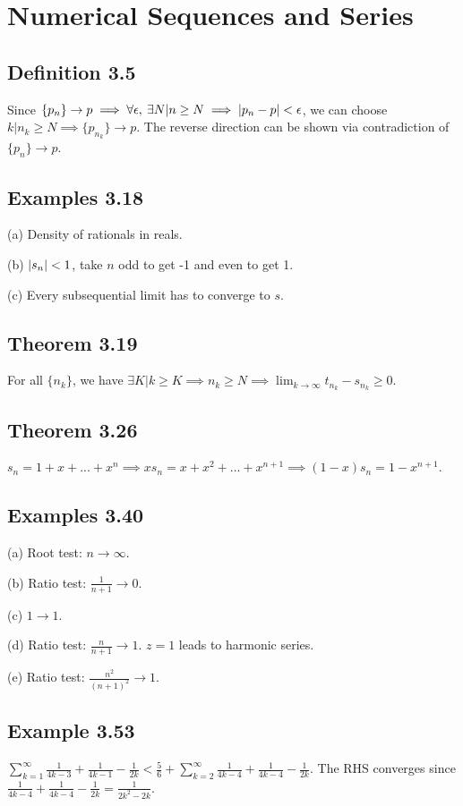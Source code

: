 \section{Numerical Sequences and Series}

\subsection*{Definition 3.5}
Since $\{p_n\} \to p \implies \forall \epsilon, \: \exists N | n \geq N \implies \abs{p_n - p} < \epsilon$,
we can choose $k | n_k \geq N \implies \{p_{n_k}\} \to p$.
The reverse direction can be shown via contradiction of $\{p_n\} \to p$.

\subsection*{Examples 3.18}
(a) Density of rationals in reals.

(b) $\abs{s_n} < 1$, take $n$ odd to get -1 and even to get 1.

(c) Every subsequential limit has to converge to $s$.

\subsection*{Theorem 3.19}
For all $\{n_k\}$, we have $\exists K | k \geq K \implies  n_k \geq N \implies \lim_{k \to \infty} t_{n_k} - s_{n_k} \geq 0$.

\subsection*{Theorem 3.26}
$s_n = 1 + x + ... + x^n \implies x s_n = x + x^2 + ... + x^{n+1} \implies (1 - x) s_n = 1 - x^{n+1}$.

\subsection*{Examples 3.40}
(a) Root test: $n \to \infty$.

(b) Ratio test: $\frac{1}{n+1} \to 0$.

(c) $1 \to 1$.

(d) Ratio test: $\frac{n}{n+1} \to 1$. $z = 1$ leads to harmonic series.

(e) Ratio test: $\frac{n^2}{(n+1)^2} \to 1$.

\subsection*{Example 3.53}
$\sum_{k=1}^{\infty} \frac{1}{4k-3} + \frac{1}{4k-1} - \frac{1}{2k} < \frac{5}{6} + \sum_{k=2}^{\infty} \frac{1}{4k-4} + \frac{1}{4k-4} - \frac{1}{2k}$. The RHS converges since $\frac{1}{4k-4} + \frac{1}{4k-4} - \frac{1}{2k} = \frac{1}{2k^2 - 2k}$.

